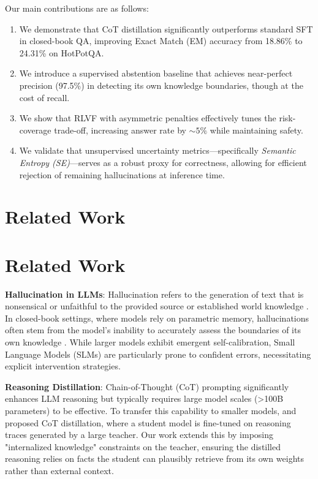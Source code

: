 \documentclass{article}
\begin{document}
Our main contributions are as follows:
\begin{enumerate}
    \item We demonstrate that CoT distillation significantly outperforms standard SFT in closed-book QA, improving Exact Match (EM) accuracy from 18.86\% to 24.31\% on HotPotQA.
    \item We introduce a supervised abstention baseline that achieves near-perfect precision (97.5\%) in detecting its own knowledge boundaries, though at the cost of recall.
    \item We show that RLVF with asymmetric penalties effectively tunes the risk-coverage trade-off, increasing answer rate by $\sim5\%$ while maintaining safety.
    \item We validate that unsupervised uncertainty metrics—specifically \emph{Semantic Entropy (SE)}—serves as a robust proxy for correctness, allowing for efficient rejection of remaining hallucinations at inference time.
\end{enumerate}

\section{Related Work}
\section{Related Work}

\textbf{Hallucination in LLMs}: Hallucination refers to the generation of text that is nonsensical or unfaithful to the provided source or established world knowledge \cite{ji2023survey}. In closed-book settings, where models rely on parametric memory, hallucinations often stem from the model's inability to accurately assess the boundaries of its own knowledge \cite{kadavath2022language}. While larger models exhibit emergent self-calibration, Small Language Models (SLMs) are particularly prone to confident errors, necessitating explicit intervention strategies.

\textbf{Reasoning Distillation}: Chain-of-Thought (CoT) prompting significantly enhances LLM reasoning but typically requires large model scales (>100B parameters) to be effective. To transfer this capability to smaller models, \cite{li2023cotdistill} and \cite{ho2023largelanguagemodelsreasoning} proposed CoT distillation, where a student model is fine-tuned on reasoning traces generated by a large teacher. Our work extends this by imposing "internalized knowledge" constraints on the teacher, ensuring the distilled reasoning relies on facts the student can plausibly retrieve from its own weights rather than external context.
\end{document}
